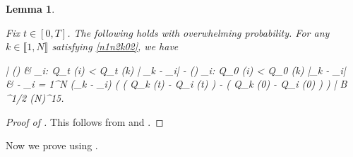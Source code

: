 \documentclass{amsart}
\numberwithin{equation}{section}
\DeclareMathOperator{\sgn}{sgn}
\newtheorem{lem}[thm]{Lemma}
\theoremstyle{remark}
\theoremstyle{definition}
\begin{document}
	\begin{lem} 
		
		\label{chiconcentration} 
		
		Fix $t \in [0, T]$. The following holds with overwhelming probability. For any $k \in \llbracket 1, N \rrbracket$ satisfying \eqref{n1n2k02}, we have
		\begin{flalign*}
			\Bigg| \sgn (\alpha) & \displaystyle\sum_{i: Q_t (i) < Q_t (k)} \log | \lambda_k - \lambda_i| - \sgn (\alpha) \displaystyle\sum_{i: Q_0 (i) < Q_0 (k)} \log |\lambda_k - \lambda_i| \\
			& - \displaystyle\sum_{i = 1}^N  (\lambda_k - \lambda_i) \cdot \big( \chi ( Q_k (t) - Q_i (t) ) - \chi ( Q_k (0) - Q_i (0) ) \big) \Bigg|  B ^{1/2} (\log N)^{15}.
		\end{flalign*}
		
	\end{lem} 
	
	\begin{proof}[Proof of ] 
		
		This follows from  and .
	\end{proof} 
	
	
	Now we prove  using . 
	
\end{document}

